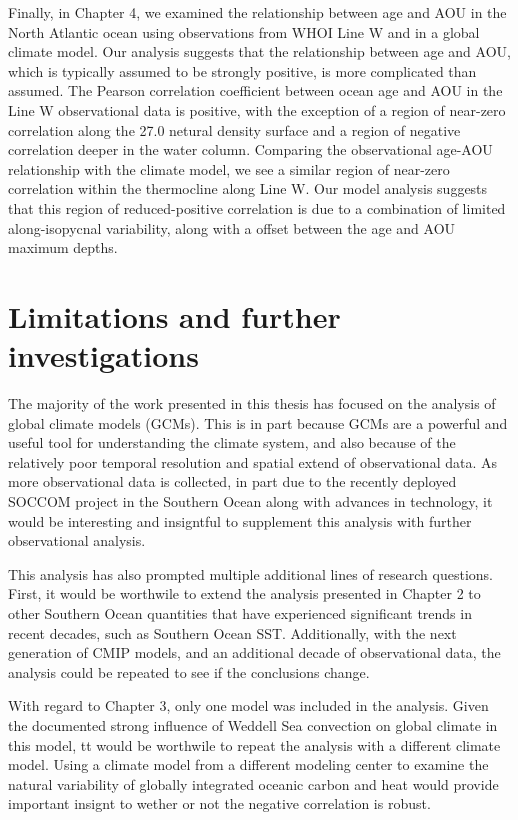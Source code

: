Finally, in Chapter 4, we examined the relationship between age and AOU in the
North Atlantic ocean using observations from WHOI Line W and in a global climate model.
Our analysis suggests that the relationship between age and AOU, which is typically
assumed to be strongly positive, is more complicated than assumed. The
Pearson correlation coefficient between ocean age and AOU in the Line W observational
data is positive, with the exception of a region of near-zero correlation along
the 27.0 netural density surface and a region of negative correlation deeper in the
water column. Comparing the observational age-AOU relationship with the climate model,
we see a similar region of near-zero correlation within the thermocline along
Line W. Our model analysis suggests that this region of reduced-positive correlation
is due to a combination of limited along-isopycnal variability, along with a
offset between the age and AOU maximum depths.






\section{Limitations and further investigations}

The majority of the work presented in this thesis has focused on the analysis of
global climate models (GCMs). This is in part because GCMs are a powerful and useful
tool for understanding the climate system, and also because of the relatively poor
temporal resolution and spatial extend of observational data. As more observational
data is collected, in part due to the recently deployed SOCCOM project in the Southern Ocean along
with advances in technology, it would be interesting and insigntful to supplement
this analysis with further observational analysis.

This analysis has also prompted multiple additional lines of research questions.
First, it would be worthwile to extend the analysis presented in Chapter 2 to other
Southern Ocean quantities that have experienced significant trends in recent decades, such
as Southern Ocean SST. Additionally, with the next generation of CMIP models, and
an additional decade of observational data, the analysis could be repeated to see
if the conclusions change.

With regard to Chapter 3, only one model was included in the analysis. Given the
documented strong influence of Weddell Sea convection on global climate in this model,
tt would be worthwile to repeat the analysis with a different climate model.
Using a climate model from a different modeling center to examine the natural variability
of globally integrated oceanic carbon and heat would provide important insignt to
wether or not the negative correlation is robust.

